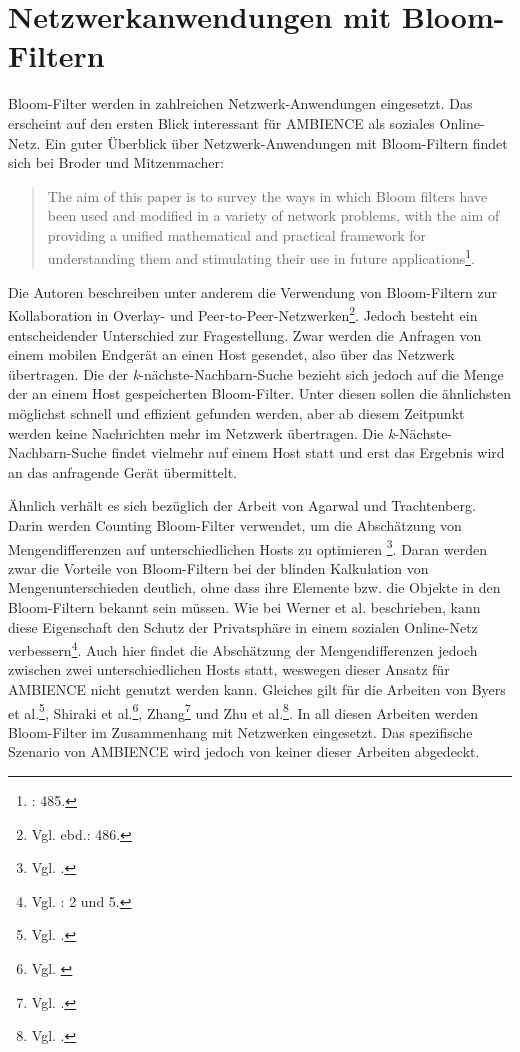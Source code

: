 \section{Netzwerkanwendungen mit Bloom-Filtern}\label{sec:bloom-netzwerk}
Bloom-Filter werden in zahlreichen Netzwerk-Anwendungen eingesetzt. Das erscheint auf den ersten Blick interessant für AMBIENCE als soziales Online-Netz. Ein guter Überblick über Netzwerk-Anwendungen mit Bloom-Filtern findet sich bei Broder und Mitzenmacher:  
\begin{quote}
The aim of this paper is to survey the ways in which Bloom filters have been used and modified in a variety of network problems, with the aim of providing a unified mathematical and practical framework for understanding them and stimulating their use in future applications\footnote{\cite{Broder2004}: 485.}.
\end{quote}
Die Autoren beschreiben unter anderem die Verwendung von Bloom-Filtern zur Kollaboration in Overlay- und Peer-to-Peer-Netzwerken\footnote{Vgl. ebd.: 486.}. Jedoch besteht ein entscheidender Unterschied zur Fragestellung. Zwar werden die Anfragen von einem mobilen Endgerät an einen Host gesendet, also über das Netzwerk übertragen. Die der \textit{k}-nächste-Nachbarn-Suche bezieht sich jedoch auf die Menge der an einem Host gespeicherten Bloom-Filter. Unter diesen sollen die ähnlichsten möglichst schnell und effizient gefunden werden, aber ab diesem Zeitpunkt werden keine Nachrichten mehr im Netzwerk übertragen. Die \textit{k}-Nächste-Nachbarn-Suche findet vielmehr auf einem Host statt und erst das Ergebnis wird an das anfragende Gerät übermittelt. 

Ähnlich verhält es sich bezüglich der Arbeit von Agarwal und Trachtenberg. Darin werden Counting Bloom-Filter verwendet, um die Abschätzung von Mengendifferenzen auf unterschiedlichen Hosts zu optimieren \footnote{Vgl. \cite{Agarwal2006}.}. Daran werden zwar die Vorteile von Bloom-Filtern bei der blinden Kalkulation von Mengenunterschieden deutlich, ohne dass ihre Elemente bzw. die Objekte in den Bloom-Filtern bekannt sein müssen. Wie bei Werner et al. beschrieben, kann diese Eigenschaft den Schutz der Privatsphäre in einem sozialen Online-Netz verbessern\footnote{Vgl. \cite{Werner2015}: 2 und 5.}. Auch hier findet die Abschätzung der Mengendifferenzen jedoch zwischen zwei unterschiedlichen Hosts statt, weswegen dieser Ansatz für AMBIENCE nicht genutzt werden kann. Gleiches gilt für die Arbeiten von Byers et al.\footnote{Vgl. \cite{Byers2002}.}, Shiraki et al.\footnote{Vgl. \cite{Shiraki2009}}, Zhang\footnote{Vgl. \cite{Zhang2012}.} und Zhu et al.\footnote{Vgl. \cite{Zhu2004}.}. In all diesen Arbeiten werden Bloom-Filter im Zusammenhang mit Netzwerken eingesetzt. Das spezifische Szenario von AMBIENCE wird jedoch von keiner dieser Arbeiten abgedeckt. 
